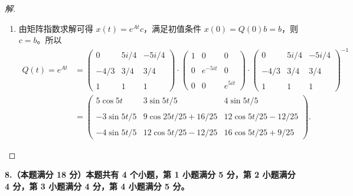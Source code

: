 \begin{proof}[解]
\begin{enumerate}[label=(\arabic*)]
（b）下面验证（a）中的 $u$ 关于 $t$ 不变，等价于说明 $\|x-u\|_{2}^{2}$ 对 $t$ 求导数为 $0$。
\begin{align*}
\frac{\partial}{\partial t}\|x-u\|_{2}^{2}
&=\frac{\partial}{\partial t}(x^{\mathrm{T}}x-2u^{\mathrm{T}}x+u^{\mathrm{T}}u)\\
&=2x^{\mathrm{T}}\dot{x}-2u^{\mathrm{T}}\dot{x}\\
&=2(x^{\mathrm{T}}Ax+u^{\mathrm{T}}Ax),
\end{align*}
因为 $x^{\mathrm{T}}Ax=u^{\mathrm{T}} Ax=0$，所以 $\dfrac{\partial}{\partial t}\|x-u\|_{2}^{2}=0$。

\item 由矩阵指数求解可得 $x(t)=e^{At}c$，满足初值条件 $x(0)=Q(0)b=b$，则 $c=b$。所以
\begin{align*}
Q(t)=e^{At}& =\begin{pmatrix}
0 & 5i/4 & -5i/4 \\ \\
-4/3 & 3/4 & 3/4 \\ \\
1 & 1 & 1
\end{pmatrix} \cdot\begin{pmatrix}
1 & 0 & 0 \\ \\
0 & e^{-5it} & 0 \\ \\
0 & 0 & e^{5it}
\end{pmatrix} \cdot\begin{pmatrix}
0 & 5i/4 & -5i/4 \\ \\
-4/3 & 3/4 & 3/4 \\ \\
1 & 1 & 1
\end{pmatrix}^{-1} \\
& =\begin{pmatrix}
5\cos 5t & 3\sin5t/5 & 4\sin 5t/5 \\ \\
-3\sin 5t/5 & 9\cos 25t/25+16/25 & 12\cos 5t/25-12/25 \\ \\
-4\sin 5t/5 & 12\cos 5t/25-12/25 & 16\cos 5t/25+9/25
\end{pmatrix}.
\end{align*}
\end{enumerate}
\end{proof}

\textbf{8.（本题满分 18 分）本题共有 4 个小题，第 1 小题满分 5 分，第 2 小题满分 4 分，第 3 小题满分 4 分，第 4 小题满分 5 分。}

